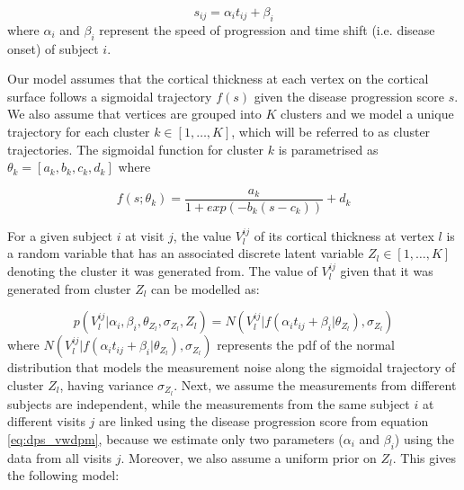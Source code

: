 \begin{equation}
\label{eq:dps_vwdpm}
 s_{ij} = \alpha_i t_{ij} + \beta_i
\end{equation}
where $\alpha_i$ and $\beta_i$ represent the speed of progression and time shift (i.e. disease onset) of subject $i$. 

Our model assumes that the cortical thickness at each vertex on the cortical surface follows a sigmoidal trajectory $f(s)$ given the disease progression score $s$. We also assume that vertices are grouped into $K$ clusters and we model a unique trajectory for each cluster $k \in [1, \dots, K]$, which will be referred to as cluster trajectories. The sigmoidal function for cluster $k$ is parametrised as $\theta_k = [a_k,b_k,c_k,d_k]$ where 

\begin{equation}
\label{eq:dps_vwdpm2}
 f(s;\theta_k) = \frac{a_k}{1+exp(-b_k(s-c_k))} + d_k
\end{equation}

For a given subject $i$ at visit $j$, the value $V_l^{ij}$ of its cortical thickness at vertex $l$ is a random variable that has an associated discrete latent variable $Z_l \in [1, \dots, K]$ denoting the cluster it was generated from. The value of $V_l^{ij}$ given that it was generated from cluster $Z_l$ can be modelled as:


\begin{equation}
\label{eq:dps_vwdpm3}
 p(V_l^{ij} | \alpha_i, \beta_i, \theta_{Z_l}, \sigma_{Z_l}, Z_l) = N(V_l^{ij} | f(\alpha_i t_{ij} + \beta_i | \theta_{Z_l}), \sigma_{Z_l})
\end{equation}
where $N(V_l^{ij} | f(\alpha_i t_{ij} + \beta_i | \theta_{Z_l}), \sigma_{Z_l})$ represents the pdf of the normal distribution that models the measurement noise along the sigmoidal trajectory of cluster $Z_l$, having variance $\sigma_{Z_l}$. Next, we assume the measurements from different subjects are independent, while the measurements from the same subject $i$ at different visits $j$ are linked using the disease progression score from equation \ref{eq:dps_vwdpm}, because we estimate only two parameters ($\alpha_i$ and $\beta_i$) using the data from all visits $j$. Moreover, we also assume a uniform prior on $Z_l$. This gives the following model:

